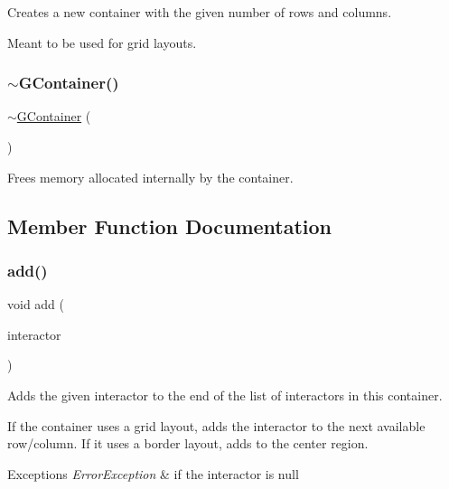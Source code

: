 Creates a new container with the given number of rows and columns. 

Meant to be used for grid layouts. \mbox{\label{classGContainer_a45b3c0c0cc9c78097c024ca842978692}} 
\subsubsection{\texorpdfstring{$\sim$\+G\+Container()}{~GContainer()}}
{\footnotesize\ttfamily $\sim$\mbox{\hyperlink{classGContainer}{G\+Container}} (\begin{DoxyParamCaption}{ }\end{DoxyParamCaption})\hspace{0.3cm}{\ttfamily [override]}}



Frees memory allocated internally by the container. 



\subsection{Member Function Documentation}
\mbox{\label{classGContainer_a6f99b7c841256dbdc5acaafbbca4e685}} 
\subsubsection{\texorpdfstring{add()}{add()}\hspace{0.1cm}{\footnotesize\ttfamily [1/2]}}
{\footnotesize\ttfamily void add (\begin{DoxyParamCaption}\item[{\mbox{\hyperlink{classGInteractor}{G\+Interactor}} $\ast$}]{interactor }\end{DoxyParamCaption})\hspace{0.3cm}{\ttfamily [virtual]}}



Adds the given interactor to the end of the list of interactors in this container. 

If the container uses a grid layout, adds the interactor to the next available row/column. If it uses a border layout, adds to the center region. 
\begin{DoxyExceptions}{Exceptions}
{\em Error\+Exception} & if the interactor is null \\
\hline
\end{DoxyExceptions}
\mbox{\label{classGContainer_a33b08fe5428ed634a658deab076099f7}} 
